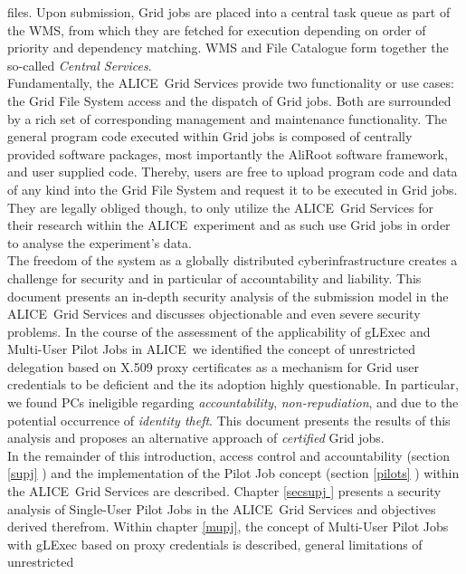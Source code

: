 \documentclass[10pt]{iopart}
\newcommand{\alice}{ALICE}
\newcommand{\aliroot}{AliRoot}
\begin{document}
files. Upon submission, Grid jobs are placed into a central task queue as part
of the WMS, from which they are
fetched for execution depending on order of priority and dependency matching.
WMS and File Catalogue
form together the so-called \textit{Central Services}.\\
Fundamentally, the \alice\ Grid Services provide two functionality
or use cases: the Grid File System access and the dispatch of Grid
jobs. Both are surrounded by a rich set of corresponding management and
maintenance functionality.
The general program code executed within Grid jobs is composed of centrally
provided software packages, most importantly the
\aliroot{}
software framework, and user supplied code. Thereby, users are free to upload program code and data of 
any kind into the Grid File System and request it to be executed in Grid jobs.
They are legally obliged though, to only utilize the \alice\ Grid Services for their research within the
\alice\ experiment and as such use Grid jobs in order to analyse the experiment's
data.\\
The freedom of the system as a globally
distributed cyberinfrastructure creates a challenge for security and in
particular of accountability and liability. This document presents an in-depth
security analysis of the submission model in the \alice\ Grid Services and discusses
objectionable and even severe security 
problems. In the course of the assessment of the
applicability of gLExec and Multi-User Pilot Jobs in \alice\, we identified the
concept of unrestricted delegation based on X.509
proxy certificates as a mechanism for Grid user credentials
 to be deficient 
and the
its adoption highly questionable. In particular, we found
PCs ineligible regarding \textit{accountability}, \textit{non-repudiation},
and due to the potential occurrence of \textit{identity theft}.
This document presents the results of
this analysis and proposes an alternative approach of \textit{certified} Grid jobs.\\
In the remainder of this introduction, 
access control and accountability (section \ref{supj} ) and the
implementation of the Pilot Job concept (section \ref{pilots} ) within the \alice\
Grid Services are described. Chapter \ref{secsupj } presents a security analysis
of Single-User Pilot Jobs in the \alice\ Grid Services and 
objectives derived therefrom. Within
chapter \ref{mupj}, the concept of Multi-User Pilot Jobs with gLExec based on
proxy credentials is described, general limitations of unrestricted
\end{document}

